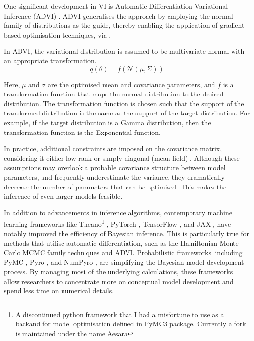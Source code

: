 One significant development in VI is Automatic Differentiation Variational Inference (ADVI) \citep{Kucukelbir2016-gn}. ADVI generalises the approach by employing the normal family of distributions as the guide, thereby enabling the application of gradient-based optimisation techniques, via .

In ADVI, the variational distribution is assumed to be multivariate normal with an appropriate transformation.
\begin{equation}
q(\theta) = f(\mathcal{N}(\mu, \Sigma))
\end{equation}

Here, $\mu$ and $\sigma$ are the optimised mean and covariance parameters, and $f$ is a transformation function that maps the normal distribution to the desired distribution. The transformation function is chosen such that the support of the transformed distribution is the same as the support of the target distribution. For example, if the target distribution is a Gamma distribution, then the transformation function is the Exponential function. 

In practice, additional constraints are imposed on the covariance matrix, considering it either low-rank or simply diagonal (mean-field) \citep{Blei2017-dm}. Although these assumptions may overlook a probable covariance structure between model parameters, and frequently underestimate the variance, they dramatically decrease the number of parameters that can be optimised. This makes the inference of even larger models feasible.

In addition to advancements in inference algorithms, contemporary machine learning frameworks like Theano\footnote{A discontinued python framework that I had a misfortune to use as a backand for model optimisation defined in PyMC3 package. Currently a fork is maintained under the name Aesara} \citep{The_Theano_Development_Team2016-pj}, PyTorch \citep{Paszke2019-kg}, TensorFlow \citep{Abadi2016-ex}, and JAX \citep{Bradbury2018-qv}, have notably improved the efficiency of Bayesian inference. This is particularly true for methods that utilise automatic differentiation, such as the Hamiltonian Monte Carlo MCMC family techniques and ADVI. Probabilistic frameworks, including PyMC \citep{Salvatier2016-uy}, Pyro \citep{Bingham2019-tx}, and NumPyro \citep{Phan2019-ku}, are simplifying the Bayesian model development process. By managing most of the underlying calculations, these frameworks allow researchers to concentrate more on conceptual model development and spend less time on numerical details.

